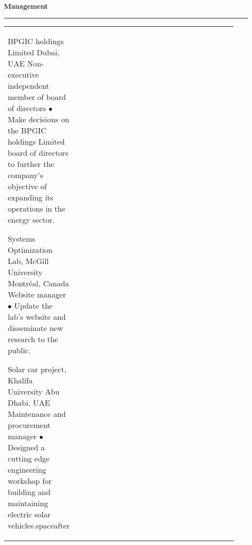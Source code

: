 \documentclass[10pt]{article} %
\begin{document}

\vspace{-\baselineskip}\medskip %


\textbf{\large Management}\medskip \hrule \medskip


\begin{supertabular}{>{\raggedleft\arraybackslash}p{0.17\linewidth}p{0.6\linewidth}>{\raggedleft\arraybackslash}p{0.17\linewidth}} %


	{} %
	{BPGIC holdings Limited} %
	{Dubai, UAE} %
	{Non-executive independent member of board of directors} %
	{$\bullet$ Make decisions on the BPGIC holdings Limited board of directors to further the company's objective of expanding its operations in the energy sector.}{} %


	{} %
	{Systems Optimization Lab, McGill University} %
	{Montr\'{e}al, Canada} %
	{Website manager} %
	{$\bullet$ Update the lab's website and disseminate new research to the public.}{} %


	{} %
	{Solar car project, Khalifa University} %
	{Abu Dhabi, UAE} %
	{Maintenance and procurement manager} %
	{$\bullet$ Designed a cutting edge engineering workshop for building and maintaining electric solar vehicles.}{spaceafter} %


\end{supertabular}
\end{document}

